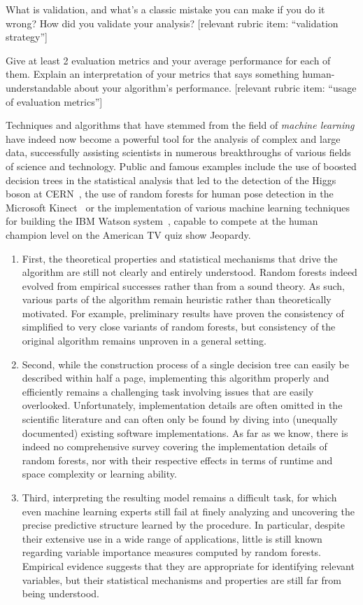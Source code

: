 \documentclass[twoside,openright,titlepage,numbers=noenddot,headinclude,%
               footinclude=true,cleardoublepage=empty,abstractoff,BCOR=5mm,%
               paper=a4,fontsize=11pt,ngerman,american]{scrreprt}
\numberwithin{theorem}{chapter}
\numberwithin{definition}{chapter}
\numberwithin{algorithm}{chapter}
\numberwithin{figure}{chapter}
\numberwithin{table}{chapter}
\numberwithin{equation}{chapter}
\begin{document}
What is validation, and what's a classic mistake you can make if you do it wrong? How did you validate your analysis?  [relevant rubric item: ``validation strategy'']


Give at least 2 evaluation metrics and your average performance for each of them.  Explain an interpretation of your metrics that says something human-understandable about your algorithm's performance. [relevant rubric item: ``usage of evaluation metrics'']


Techniques and algorithms that have stemmed from the field of {\it machine learning} have
indeed now become a powerful tool for the analysis of complex and large data,
successfully assisting scientists in numerous breakthroughs of various fields
of science and technology. Public and famous examples include the use of
boosted decision trees in the statistical analysis that led to the detection of
the Higgs boson at CERN~\citep{chatrchyan:2012}, the use of random forests for
human pose detection in the Microsoft Kinect~\citep{criminisi:2013} or the
implementation of various machine learning techniques for building the IBM
Watson system~\citep{ferrucci:2010}, capable to compete at the human champion
level on the American TV quiz show Jeopardy.


\begin{enumerate}
\item First, the theoretical properties and statistical mechanisms that drive
the algorithm are still not clearly and entirely understood. Random forests
indeed evolved from empirical successes rather than from a sound
theory. As such, various parts of the algorithm remain heuristic rather than
theoretically motivated. For example, preliminary
results have proven the consistency of simplified to very close variants of
random forests, but consistency of the original algorithm remains unproven
in a general setting.
\item Second, while the construction process of a single decision tree can
easily be described within half a page, implementing this algorithm properly
and efficiently remains a challenging task involving issues that are easily
overlooked. Unfortunately, implementation details are often omitted in the
scientific literature and can often only be found by diving into
(unequally documented) existing software implementations. As far as we know,
there is indeed no comprehensive survey covering the implementation details of
random forests, nor with their respective effects in terms of runtime and space
complexity or learning ability.
\item Third, interpreting the resulting model remains a difficult task,
for which even machine learning experts still fail at finely analyzing and
uncovering the precise predictive structure learned by the procedure.
In particular, despite their extensive use in a wide range of applications, little
is still known regarding variable importance measures computed by random forests.
Empirical evidence suggests that they are appropriate for identifying
relevant variables, but their statistical mechanisms and properties are
still far from being understood.
\end{enumerate}
\end{document}
